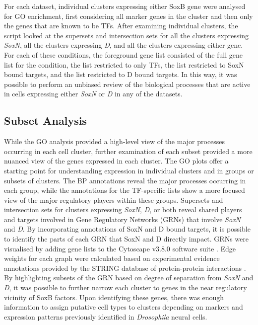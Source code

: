 \documentclass[withindex,glossary]{cam-thesis}
\begin{document}
For each dataset, individual clusters expressing either SoxB gene were
analysed for GO enrichment, first considering all marker genes in the
cluster and then only the genes that are known to be TFs. After
examining individual clusters, the script looked at the supersets and
intersection sets for all the clusters expressing \emph{SoxN}, all the
clusters expressing \emph{D}, and all the clusters expressing either
gene. For each of these conditions, the foreground gene list consisted
of the full gene list for the condition, the list restricted to only
TFs, the list restricted to SoxN bound targets, and the list restricted
to D bound targets. In this way, it was possible to perform an unbiased
review of the biological processes that are active in cells expressing
either \emph{SoxN} or \emph{D} in any of the datasets.

\subsection{Subset Analysis}

While the GO analysis provided a high-level view of the major processes
occurring in each cell cluster, further examination of each subset
provided a more nuanced view of the genes expressed in each cluster. The
GO plots offer a starting point for understanding expression in
individual clusters and in groups or subsets of clusters. The BP
annotations reveal the major processes occurring in each group, while
the annotations for the TF-specific lists show a more focused view of
the major regulatory players within these groups. Supersets and
intersection sets for clusters expressing \emph{SoxN}, \emph{D}, or both
reveal shared players and targets involved in Gene Regulatory Networks
(\gls{GRN}s) that involve \emph{SoxN} and \emph{D}. By incorporating
annotations of SoxN and D bound targets, it is possible to identify the
parts of each GRN that SoxN and D directly impact. GRNs were visualised
by adding gene lists to the Cytoscape v3.8.0 software suite . Edge weights for each graph were calculated based on
experimental evidence annotations provided by the STRING database of
protein-protein interactions . By highlighting
subsets of the GRN based on degree of separation from \emph{SoxN} and
\emph{D}, it was possible to further narrow each cluster to genes in the
near regulatory vicinity of SoxB factors. Upon identifying these genes,
there was enough information to assign putative cell types to clusters
depending on markers and expression patterns previously identified in
\emph{Drosophila} neural cells.
\end{document}
